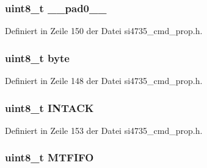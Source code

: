 \subsubsection[{\+\_\+\+\_\+pad0\+\_\+\+\_\+}]{\setlength{\rightskip}{0pt plus 5cm}uint8\+\_\+t \+\_\+\+\_\+pad0\+\_\+\+\_\+}\label{unionfm__rds__status__arg1_a8b4eebe79ded0459acec2f4950102ba3}


Definiert in Zeile 150 der Datei si4735\+\_\+cmd\+\_\+prop.\+h.

\hypertarget{unionfm__rds__status__arg1_a96f44d20f1dbf1c8785a7bc99a46164c}{}
\subsubsection[{byte}]{\setlength{\rightskip}{0pt plus 5cm}uint8\+\_\+t byte}\label{unionfm__rds__status__arg1_a96f44d20f1dbf1c8785a7bc99a46164c}


Definiert in Zeile 148 der Datei si4735\+\_\+cmd\+\_\+prop.\+h.

\hypertarget{unionfm__rds__status__arg1_adf4f80d8fb205d6c93c6423d84d63d9c}{}
\subsubsection[{I\+N\+T\+A\+C\+K}]{\setlength{\rightskip}{0pt plus 5cm}uint8\+\_\+t I\+N\+T\+A\+C\+K}\label{unionfm__rds__status__arg1_adf4f80d8fb205d6c93c6423d84d63d9c}


Definiert in Zeile 153 der Datei si4735\+\_\+cmd\+\_\+prop.\+h.

\hypertarget{unionfm__rds__status__arg1_a3490701acd7d75adf4ecbe2192e9fcfd}{}
\subsubsection[{M\+T\+F\+I\+F\+O}]{\setlength{\rightskip}{0pt plus 5cm}uint8\+\_\+t M\+T\+F\+I\+F\+O}\label{unionfm__rds__status__arg1_a3490701acd7d75adf4ecbe2192e9fcfd}


